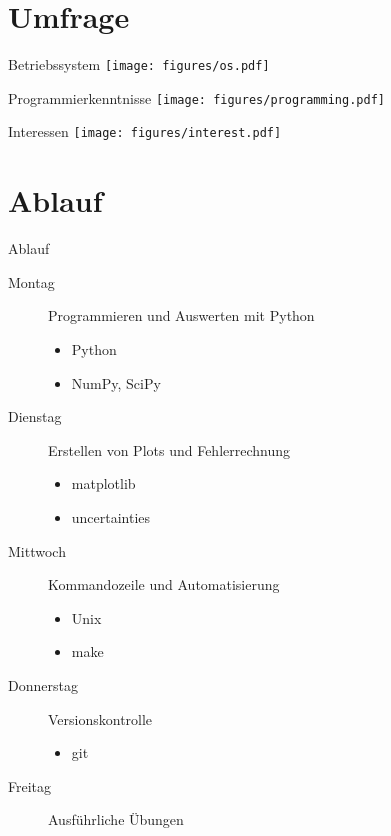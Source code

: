 \section{Umfrage}


\begin{frame}{Betriebssystem}
  \centering
  \texttt{[image: figures/os.pdf]}
\end{frame}

\begin{frame}{Programmierkenntnisse}
  \centering
  \texttt{[image: figures/programming.pdf]}
\end{frame}

\begin{frame}{Interessen}
  \centering
  \texttt{[image: figures/interest.pdf]}
\end{frame}

\section{Ablauf}

\begin{frame}{Ablauf}
  \begin{description}
    \item[Montag] Programmieren und Auswerten mit Python
      \begin{itemize}
        \item Python
        \item NumPy, SciPy
      \end{itemize}
    \item[Dienstag] Erstellen von Plots und Fehlerrechnung
      \begin{itemize}
        \item matplotlib
        \item uncertainties
      \end{itemize}
    \item[Mittwoch] Kommandozeile und Automatisierung
      \begin{itemize}
        \item Unix
        \item make
      \end{itemize}
    \item[Donnerstag] Versionskontrolle
      \begin{itemize}
        \item git
      \end{itemize}
    \item[Freitag] Ausführliche Übungen
  \end{description}
\end{frame}

